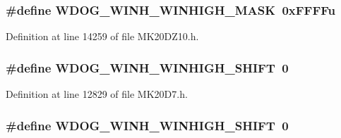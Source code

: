 \subsubsection[{\texorpdfstring{W\+D\+O\+G\+\_\+\+W\+I\+N\+H\+\_\+\+W\+I\+N\+H\+I\+G\+H\+\_\+\+M\+A\+SK}{WDOG_WINH_WINHIGH_MASK}}]{\setlength{\rightskip}{0pt plus 5cm}\#define W\+D\+O\+G\+\_\+\+W\+I\+N\+H\+\_\+\+W\+I\+N\+H\+I\+G\+H\+\_\+\+M\+A\+SK~0x\+F\+F\+F\+Fu}\hypertarget{group___w_d_o_g___register___masks_ga6efef6fddbc8b8600a8dee5a24659068}{}\label{group___w_d_o_g___register___masks_ga6efef6fddbc8b8600a8dee5a24659068}


Definition at line 14259 of file M\+K20\+D\+Z10.\+h.

\subsubsection[{\texorpdfstring{W\+D\+O\+G\+\_\+\+W\+I\+N\+H\+\_\+\+W\+I\+N\+H\+I\+G\+H\+\_\+\+S\+H\+I\+FT}{WDOG_WINH_WINHIGH_SHIFT}}]{\setlength{\rightskip}{0pt plus 5cm}\#define W\+D\+O\+G\+\_\+\+W\+I\+N\+H\+\_\+\+W\+I\+N\+H\+I\+G\+H\+\_\+\+S\+H\+I\+FT~0}\hypertarget{group___w_d_o_g___register___masks_ga362e7a13b632027b940135991c9d169b}{}\label{group___w_d_o_g___register___masks_ga362e7a13b632027b940135991c9d169b}


Definition at line 12829 of file M\+K20\+D7.\+h.

\subsubsection[{\texorpdfstring{W\+D\+O\+G\+\_\+\+W\+I\+N\+H\+\_\+\+W\+I\+N\+H\+I\+G\+H\+\_\+\+S\+H\+I\+FT}{WDOG_WINH_WINHIGH_SHIFT}}]{\setlength{\rightskip}{0pt plus 5cm}\#define W\+D\+O\+G\+\_\+\+W\+I\+N\+H\+\_\+\+W\+I\+N\+H\+I\+G\+H\+\_\+\+S\+H\+I\+FT~0}\hypertarget{group___w_d_o_g___register___masks_ga362e7a13b632027b940135991c9d169b}{}\label{group___w_d_o_g___register___masks_ga362e7a13b632027b940135991c9d169b}


